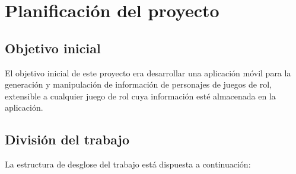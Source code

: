 
\section{Planificación del proyecto}
\subsection{Objetivo inicial}
El objetivo inicial de este proyecto era desarrollar una 
aplicación móvil para la generación y manipulación de información 
de personajes de juegos de rol, extensible a cualquier juego de rol 
cuya información esté almacenada en la aplicación.

\subsection{División del trabajo}
La estructura de desglose del trabajo está dispuesta a continuación: 


